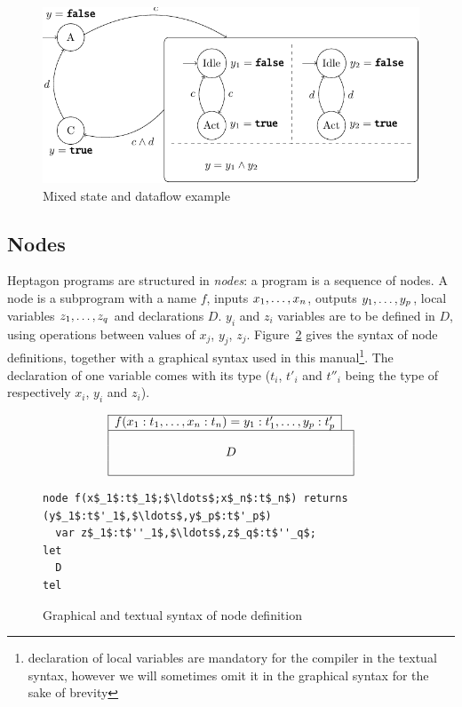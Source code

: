 \documentclass[a4paper]{article}
\begin{document}
\begin{figure}[htbp]
  \centering
  \includegraphics{figures/mixed-state-df}
  \caption{Mixed state and dataflow example}
  \label{fig:mixed-state-dataflow-example}
\end{figure}

\subsection{Nodes}
\label{sec:nodes}

Heptagon programs are structured in \emph{nodes}: a program is a sequence of
nodes. A node is a subprogram with a name $f$, inputs $\ton{x}{,}$, outputs
$\ton[1][p]{y}{,}$, local variables $\ton[1][q]{z}{,}$ and declarations
$D$. $y_i$ and $z_i$ variables are to be defined in $D$, using operations
between values of $x_j$, $y_j$, $z_j$. Figure~\ref{fig:syntax-nodes} gives the
syntax of node definitions, together with a graphical syntax used in this
manual\footnote{declaration of local variables are mandatory for the compiler in
  the textual syntax, however we will sometimes omit it in the graphical syntax
  for the sake of brevity}. The declaration of one variable comes with its type
($t_i$, $t'_i$ and $t''_i$ being the type of respectively $x_i$, $y_i$ and
$z_i$).

\begin{figure}[htb]
  \centering
    \[
    \begin{array}{|c|c}
      \cline{1-1}
      f(x_1:t_1,\ldots,x_n:t_n) = y_1:t'_1,\ldots,y_p:t'_p & \\\hline
      \multicolumn{2}{|c|}{}\\
      \multicolumn{2}{|c|}{D}\\
      \multicolumn{2}{|c|}{}\\\hline
    \end{array}
    \]
\begin{lstlisting}
node f(x$_1$:t$_1$;$\ldots$;x$_n$:t$_n$) returns (y$_1$:t$'_1$,$\ldots$,y$_p$:t$'_p$)
  var z$_1$:t$''_1$,$\ldots$,z$_q$:t$''_q$;
let
  D
tel
\end{lstlisting}
  \caption{Graphical and textual syntax of node definition}
  \label{fig:syntax-nodes}
\end{figure}
\end{document}
